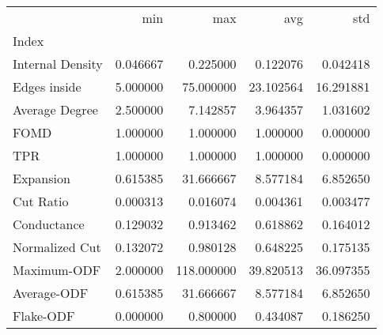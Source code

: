 \begin{tabular}{lrrrr}
\toprule
{} &       min &         max &        avg &        std \\
Index            &           &             &            &            \\
\midrule
Internal Density &  0.046667 &    0.225000 &   0.122076 &   0.042418 \\
Edges inside     &  5.000000 &   75.000000 &  23.102564 &  16.291881 \\
Average Degree   &  2.500000 &    7.142857 &   3.964357 &   1.031602 \\
FOMD             &  1.000000 &    1.000000 &   1.000000 &   0.000000 \\
TPR              &  1.000000 &    1.000000 &   1.000000 &   0.000000 \\
Expansion        &  0.615385 &   31.666667 &   8.577184 &   6.852650 \\
Cut Ratio        &  0.000313 &    0.016074 &   0.004361 &   0.003477 \\
Conductance      &  0.129032 &    0.913462 &   0.618862 &   0.164012 \\
Normalized Cut   &  0.132072 &    0.980128 &   0.648225 &   0.175135 \\
Maximum-ODF      &  2.000000 &  118.000000 &  39.820513 &  36.097355 \\
Average-ODF      &  0.615385 &   31.666667 &   8.577184 &   6.852650 \\
Flake-ODF        &  0.000000 &    0.800000 &   0.434087 &   0.186250 \\
\bottomrule
\end{tabular}
